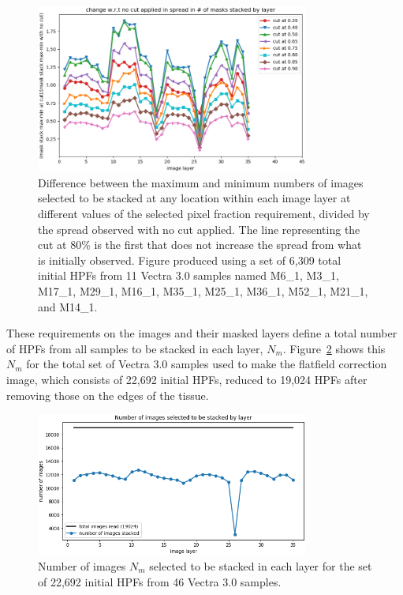 \documentclass[letterpaper,11pt]{article}
\newcommand{\reffig}[1]{Figure~\ref{#1}}
\begin{document}
\begin{figure}[!ht]
\centering
\includegraphics[width=0.80\textwidth]{images/measuring_flatfield_corrections/example_mask_stack_spreads_by_layer}
\caption{\footnotesize Difference between the maximum and minimum numbers of images selected to be stacked at any location within each image layer at different values of the selected pixel fraction requirement, divided by the spread observed with no cut applied. The line representing the cut at 80\% is the first that does not increase the spread from what is initially observed. Figure produced using a set of 6,309 total initial HPFs from 11 Vectra 3.0 samples named M6\_1, M3\_1, M17\_1, M29\_1, M16\_1, M35\_1, M25\_1, M36\_1, M52\_1, M21\_1, and M14\_1.}
\label{fig:selected_pixel_fraction_cut_2}
\end{figure} 

These requirements on the images and their masked layers define a total number of HPFs from all samples to be stacked in each layer, $N_{m}$. \reffig{fig:n_images_stacked_by_layer} shows this $N_{m}$ for the total set of Vectra 3.0 samples used to make the flatfield correction image, which consists of 22,692 initial HPFs, reduced to 19,024 HPFs after removing those on the edges of the tissue. 

\begin{figure}[!ht]
\centering
\includegraphics[width=0.80\textwidth]{images/measuring_flatfield_corrections/n_images_stacked_per_layer}
\caption{\footnotesize Number of images $N_{m}$ selected to be stacked in each layer for the set of 22,692 initial HPFs from 46 Vectra 3.0 samples.}
\label{fig:n_images_stacked_by_layer}
\end{figure} 
\end{document}
